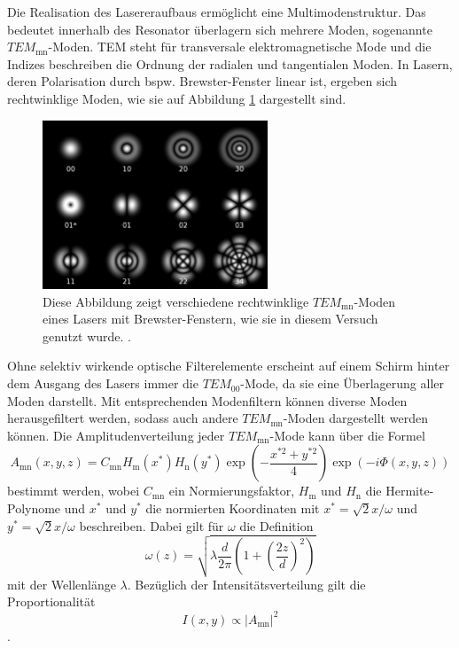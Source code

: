 Die Realisation des Lasereraufbaus ermöglicht eine Multimodenstruktur. Das bedeutet 
innerhalb des Resonator überlagern sich mehrere Moden, sogenannte 
$TEM_{\text{mn}}$-Moden. TEM steht für transversale elektromagnetische Mode und die 
Indizes beschreiben die Ordnung der radialen und tangentialen Moden.
In Lasern, deren Polarisation durch bspw. Brewster-Fenster linear ist, ergeben sich 
rechtwinklige Moden, wie sie auf Abbildung \ref{abb3} dargestellt sind.
\begin{figure}
    \centering
    \includegraphics[width=0.6\textwidth]{figure/TEMmoden.pdf}
    \caption{Diese Abbildung zeigt verschiedene rechtwinklige $TEM_{\text{mn}}$-Moden 
    eines Lasers mit Brewster-Fenstern, wie sie in diesem Versuch genutzt wurde.
    \cite{TEMmoden}.}
    \label{abb3}
\end{figure}
Ohne selektiv wirkende optische Filterelemente erscheint auf einem Schirm hinter dem 
Ausgang des Lasers immer die $TEM_{\text{00}}$-Mode, da sie eine Überlagerung aller 
Moden darstellt. Mit entsprechenden Modenfiltern 
können diverse Moden herausgefiltert werden, sodass auch andere $TEM_{\text{mn}}$-Moden
dargestellt werden können.
Die Amplitudenverteilung jeder $TEM_{\text{mn}}$-Mode kann über die Formel 
\begin{equation}
    A_{\text{mn}} (x,y,z) = C_{\text{mn}} H_{\text{m}}(x^*) H_{\text{n}}(y^*) \exp(- \frac{x^{*2} + y^{*2}}{ 4} ) \exp(-i\Phi(x,y,z))
    \label{eq5}
\end{equation}
bestimmt werden, wobei $C_{\text{mn}}$ ein Normierungsfaktor, 
$H_{\text{m}}$ und $H_{\text{n}}$ die Hermite-Polynome und $x^*$ und $y^*$ die 
normierten Koordinaten mit $x^* = \sqrt{2}x/\omega$ und 
$y^* = \sqrt{2}x/\omega$ beschreiben. Dabei gilt für $\omega$ die Definition
\begin{equation}
    \omega(z) = \sqrt{ \lambda \frac{d}{2 \pi } \left( 1+ \left( \frac{2z}{d} \right)^2 \right) }
\end{equation}
mit der Wellenlänge $\lambda$. 
Bezüglich der Intensitätsverteilung gilt die Proportionalität
\begin{equation}
    I(x,y) \propto |A_{\text{mn}}|^2
    \label{eq6}
\end{equation} 
\cite{1}.
\newpage

